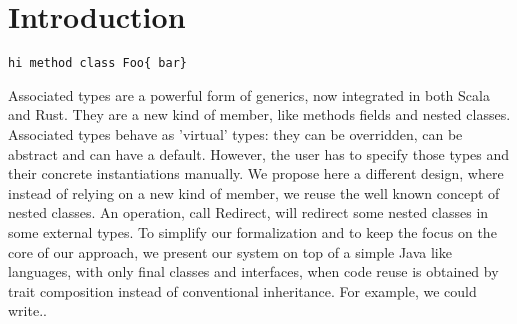 \section{Introduction}
\begin{lstlisting}
hi method class Foo{ bar}
\end{lstlisting}


Associated types are a powerful form of generics, now integrated in both Scala and Rust.
They are a new kind of member, like methods fields and nested classes.
Associated types behave as 'virtual' types: they can be overridden, can be abstract and can have
a default.
However, the user has to specify those types and their concrete instantiations manually.
We propose here a different design, where instead of relying on a new kind of member, we reuse the well
known concept of nested classes. An operation, call Redirect, will redirect some nested classes in some external types.
To simplify our formalization and to keep the focus on the core of our approach, we 
present our system on top of a simple 
Java like languages, with only final classes and interfaces, when code reuse is obtained by
trait composition instead of conventional inheritance. 
For example, we could write..

